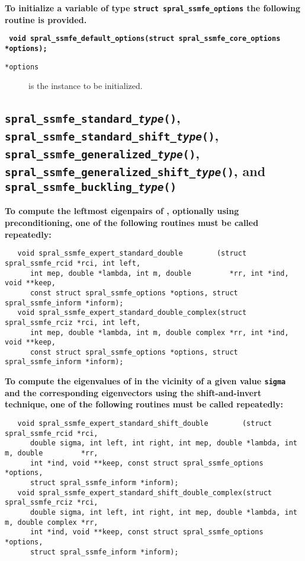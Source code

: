 \textbf{To initialize a variable of type \texttt{struct spral\_ssmfe\_options}
the following routine is provided.}

\medskip
\noindent
\textbf{\texttt{
      \hspace*{0.3cm} void spral\_ssmfe\_default\_options(struct spral\_ssmfe\_core\_options *options);
}}

\noindent
\begin{description}
   \item[\texttt{*options}] is the instance to be initialized.
\end{description}

\subsection{%
   \texttt{spral\_ssmfe\_standard\_\textit{type}()},
   \texttt{spral\_ssmfe\_standard\_shift\_\textit{type}()},\\
   \texttt{spral\_ssmfe\_generalized\_\textit{type}()},
   \texttt{spral\_ssmfe\_generalized\_shift\_\textit{type}()}, and
   \texttt{spral\_ssmfe\_buckling\_\textit{type}()}
}
\label{ssmfe_expert:routine:solver}

{\bf
To compute
the leftmost eigenpairs of ,
optionally using preconditioning,
one of the following routines must be called repeatedly:
}
\begin{verbatim}
   void spral_ssmfe_expert_standard_double        (struct spral_ssmfe_rcid *rci, int left,
      int mep, double *lambda, int m, double         *rr, int *ind, void **keep,
      const struct spral_ssmfe_options *options, struct spral_ssmfe_inform *inform);
   void spral_ssmfe_expert_standard_double_complex(struct spral_ssmfe_rciz *rci, int left,
      int mep, double *lambda, int m, double complex *rr, int *ind, void **keep,
      const struct spral_ssmfe_options *options, struct spral_ssmfe_inform *inform);   
\end{verbatim}

\medskip
\noindent
{\bf
To compute the eigenvalues of  %
in the vicinity of a given value {\tt sigma}
and the corresponding eigenvectors using the shift-and-invert technique,
one of the following routines must be called repeatedly:
}
\begin{verbatim}
   void spral_ssmfe_expert_standard_shift_double        (struct spral_ssmfe_rcid *rci,
      double sigma, int left, int right, int mep, double *lambda, int m, double         *rr,
      int *ind, void **keep, const struct spral_ssmfe_options *options,
      struct spral_ssmfe_inform *inform);
   void spral_ssmfe_expert_standard_shift_double_complex(struct spral_ssmfe_rciz *rci,
      double sigma, int left, int right, int mep, double *lambda, int m, double complex *rr,
      int *ind, void **keep, const struct spral_ssmfe_options *options,
      struct spral_ssmfe_inform *inform);
\end{verbatim}

